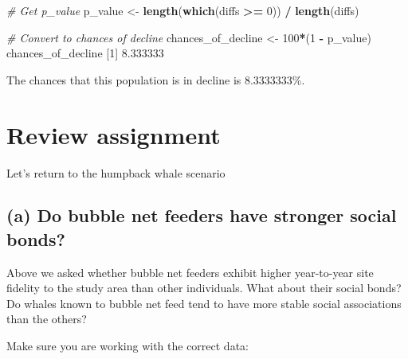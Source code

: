 \documentclass[]{book}
\newenvironment{Shaded}{\begin{snugshade}}{\end{snugshade}}
\newcommand{\CommentTok}[1]{\textcolor[rgb]{0.56,0.35,0.01}{\textit{#1}}}
\newcommand{\DecValTok}[1]{\textcolor[rgb]{0.00,0.00,0.81}{#1}}
\newcommand{\FloatTok}[1]{\textcolor[rgb]{0.00,0.00,0.81}{#1}}
\newcommand{\KeywordTok}[1]{\textcolor[rgb]{0.13,0.29,0.53}{\textbf{#1}}}
\newcommand{\NormalTok}[1]{#1}
\newcommand{\OperatorTok}[1]{\textcolor[rgb]{0.81,0.36,0.00}{\textbf{#1}}}
\newcommand{\StringTok}[1]{\textcolor[rgb]{0.31,0.60,0.02}{#1}}
\begin{document}
\begin{Shaded}
\begin{Highlighting}[]
\CommentTok{# Get p_value}
\NormalTok{p_value <-}\StringTok{ }\KeywordTok{length}\NormalTok{(}\KeywordTok{which}\NormalTok{(diffs }\OperatorTok{>=}\StringTok{ }\DecValTok{0}\NormalTok{)) }\OperatorTok{/}\StringTok{ }\KeywordTok{length}\NormalTok{(diffs)}

\CommentTok{# Convert to chances of decline}
\NormalTok{chances_of_decline <-}\StringTok{ }\DecValTok{100}\OperatorTok{*}\NormalTok{(}\DecValTok{1} \OperatorTok{-}\StringTok{ }\NormalTok{p_value)}
\NormalTok{chances_of_decline}
\NormalTok{[}\DecValTok{1}\NormalTok{] }\FloatTok{8.333333}
\end{Highlighting}
\end{Shaded}

The chances that this population is in decline is 8.3333333\%.

\hypertarget{review-assignment-5}{%
\section*{Review assignment}\label{review-assignment-5}}

Let's return to the humpback whale scenario

\hypertarget{a-do-bubble-net-feeders-have-stronger-social-bonds}{%
\subsection*{(a) Do bubble net feeders have stronger social bonds?}\label{a-do-bubble-net-feeders-have-stronger-social-bonds}}

Above we asked whether bubble net feeders exhibit higher year-to-year site fidelity to the study area than other individuals. What about their social bonds? Do whales known to bubble net feed tend to have more stable social associations than the others?

Make sure you are working with the correct data:

\begin{Shaded}
\end{Shaded}
\end{document}
